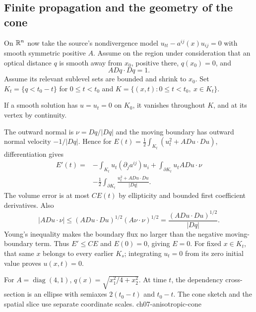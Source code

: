 \Needspace{55mm}
\subsection{Finite propagation and the geometry of the cone}
On $\mathbb{R}^n$ now take the source's nondivergence model
$u_{tt}-a^{ij}(x)u_{ij}=0$ with smooth symmetric positive $A$.
Assume on the region under consideration that an optical distance $q$ is
smooth away from $x_0$, positive there, $q(x_0)=0$, and
\[
 A Dq\cdot Dq=1.
\]
Assume its relevant sublevel sets are bounded and shrink to $x_0$.
Set $K_t=\{q<t_0-t\}$ for $0\leq t<t_0$ and
$K=\{(x,t):0\leq t<t_0,\ x\in K_t\}$.
\Needspace{55mm}
\begin{theorem}
If a smooth solution has $u=u_t=0$ on $K_0$, it vanishes throughout $K$,
and at its vertex by continuity.
\end{theorem}
\begin{expandedproof}
The outward normal is $\nu=Dq/|Dq|$ and the moving boundary has outward
normal velocity $-1/|Dq|$. Hence for
$E(t)=\frac12\int_{K_t}(u_t^2+A Du\cdot Du)$, differentiation gives
\[
 \begin{split}
 E'(t)={}&-\int_{K_t}u_t(\partial_j a^{ij})u_i
 +\int_{\partial K_t}u_t A Du\cdot\nu\\
 &-\frac12\int_{\partial K_t}
       \frac{u_t^2+A Du\cdot Du}{|Dq|}.
 \end{split}
\]
The volume error is at most $CE(t)$ by ellipticity and bounded first
coefficient derivatives. Also
\[
 |A Du\cdot\nu|\leq(A Du\cdot Du)^{1/2}(A\nu\cdot\nu)^{1/2}
 =\frac{(A Du\cdot Du)^{1/2}}{|Dq|}.
\]
Young's inequality makes the boundary flux no larger than the negative
moving-boundary term. Thus $E'\leq CE$ and $E(0)=0$, giving $E=0$.
For fixed $x\in K_t$, that same $x$ belongs to every earlier $K_s$;
integrating $u_t=0$ from its zero initial value proves $u(x,t)=0$.
\end{expandedproof}
\Needspace{55mm}

{For $A=\operatorname{diag}(4,1)$, $q(x)=\sqrt{x_1^2/4+x_2^2}$. At time $t$, the dependency cross-section is an ellipse with semiaxes $2(t_0-t)$ and $t_0-t$. The cone sketch and the spatial slice use separate coordinate scales.}
{ch07-anisotropic-cone}

